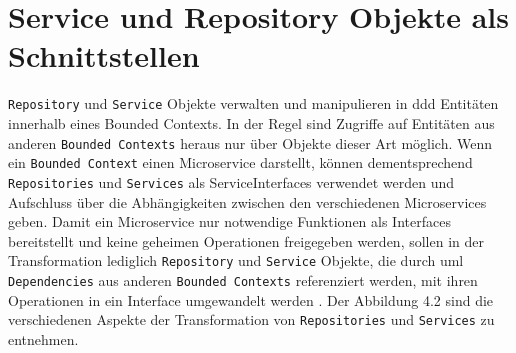 \documentclass[
	oneside,  %
	ngerman, 
	final, 
	11pt, 
	a4paper, 
	1.1headlines, 
	headinclude=false, 
	footinclude=false, 
	mpinclude=false, 
	pagesize, 
	onecolumn, 
	titlepage, 
	parskip=half, 
	headsepline, 
	chapterprefix=false, 
	version=first, 
	listof=totoc, 
	bibliography=totoc, 
	toc=graduated, 
	fleqn
]{scrbook}
\begin{document}
\section{Service und Repository Objekte als Schnittstellen}
\texttt{Repository} und \texttt{Service} Objekte verwalten und manipulieren in \ac{ddd} Entitäten innerhalb eines Bounded Contexts. In der Regel sind Zugriffe auf Entitäten aus anderen \texttt{Bounded Contexts} heraus nur über Objekte dieser Art möglich. \cite{DDDEvans} Wenn ein \texttt{Bounded Context} einen Microservice darstellt, können dementsprechend \texttt{Repositories} und \texttt{Services} als ServiceInterfaces verwendet werden und Aufschluss über die Abhängigkeiten zwischen den verschiedenen Microservices geben. Damit ein Microservice nur notwendige Funktionen als Interfaces bereitstellt und keine geheimen Operationen freigegeben werden, sollen in der Transformation lediglich \texttt{Repository} und \texttt{Service} Objekte, die durch \ac{uml} \texttt{Dependencies} aus anderen \texttt{Bounded Contexts} referenziert werden, mit ihren Operationen in ein Interface umgewandelt werden \cite{Rademacher2017}. Der Abbildung 4.2 sind die verschiedenen Aspekte der Transformation von \texttt{Repositories} und \texttt{Services} zu entnehmen. 
\end{document}
